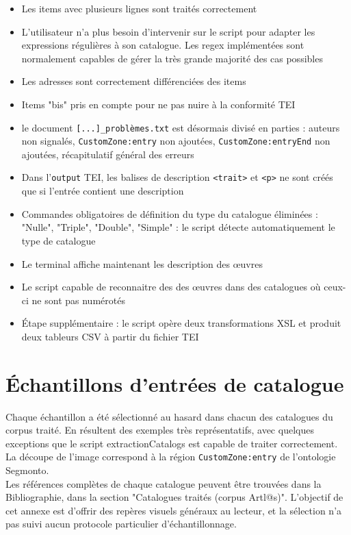 \documentclass[a4paper,12pt,twoside]{book}
\begin{document}
\begin{itemize}
	\item Les items avec plusieurs lignes sont traités correctement
	\item L'utilisateur n'a plus besoin d'intervenir sur le script pour adapter les expressions régulières à son catalogue. Les regex implémentées sont normalement capables de gérer la très grande majorité des cas possibles
	\item Les adresses sont correctement différenciées des items
	\item Items "bis" pris en compte pour ne pas nuire à la conformité TEI
	\item le document \texttt{[...]\_problèmes.txt} est désormais divisé en parties : auteurs non signalés, \texttt{CustomZone:entry} non ajoutées, \texttt{CustomZone:entryEnd} non ajoutées, récapitulatif général des erreurs
	\item Dans l'\texttt{output} TEI, les balises de description \texttt{<trait>} et \texttt{<p>} ne sont créés que si l'entrée contient une description
	\item Commandes obligatoires de définition du type du catalogue éliminées : "Nulle",  "Triple", "Double", "Simple" : le script détecte automatiquement le type de catalogue
	\item Le terminal affiche maintenant les description des œuvres
	\item Le script capable de reconnaitre des des œuvres dans des catalogues où ceux-ci ne sont pas numérotés
	\item Étape supplémentaire : le script opère deux transformations XSL et produit deux tableurs CSV à partir du fichier TEI	
\end{itemize}



\chapter{Échantillons d'entrées de catalogue}	
Chaque échantillon a été sélectionné au hasard dans chacun des catalogues du corpus traité. En résultent des exemples très représentatifs, avec quelques exceptions que le script extractionCatalogs est capable de traiter correctement\textsl{}.\\
 
La découpe de l'image correspond à la région \texttt{CustomZone:entry} de l'ontologie Segmonto.\\
\textsl{}
Les références complètes de chaque catalogue peuvent être trouvées dans la Bibliographie, dans la section "Catalogues traités (corpus Artl@s)".
L'objectif de cet annexe est d'offrir des repères visuels généraux au lecteur,\textsl{} et la sélection n'a pas suivi aucun protocole particulier d'échantillonnage. 
\end{document}
